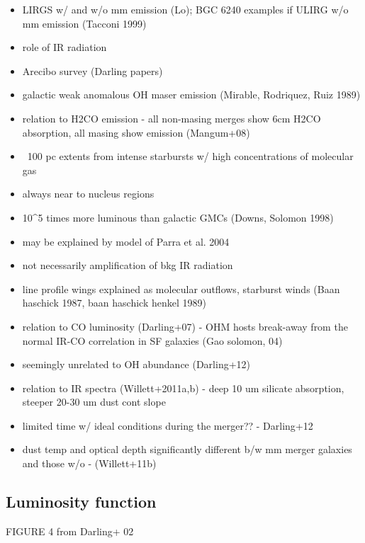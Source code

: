 \begin{itemize}
\item LIRGS w/ and w/o mm emission (Lo); BGC 6240 examples if ULIRG w/o mm emission (Tacconi 1999)
\item role of IR radiation
\item Arecibo survey (Darling papers)
\item galactic weak anomalous OH maser emission (Mirable, Rodriquez, Ruiz 1989)
\item relation to H2CO emission - all non-masing merges show 6cm H2CO absorption, all masing show emission (Mangum+08)
\item ~100 pc extents from intense starbursts w/ high concentrations of molecular gas
\item always near to nucleus regions
\item 10^5 times more luminous than galactic GMCs (Downs, Solomon 1998)
\item may be explained by model of Parra et al. 2004
\item not necessarily amplification of bkg IR radiation
\item line profile wings explained as molecular outflows, starburst winds (Baan haschick 1987, baan haschick henkel 1989)
\item relation to CO luminosity (Darling+07) - OHM hosts break-away from the normal IR-CO correlation in SF galaxies (Gao solomon, 04)
\item seemingly unrelated to OH abundance  (Darling+12)
\item relation to IR spectra (Willett+2011a,b) - deep 10 um silicate absorption, steeper 20-30 um dust cont slope
\item limited time w/ ideal conditions during the merger?? - Darling+12
\item dust temp and optical depth significantly different b/w mm merger galaxies and those w/o - (Willett+11b)
\end{itemize}

\subsection{Luminosity function}

FIGURE 4 from Darling+ 02

